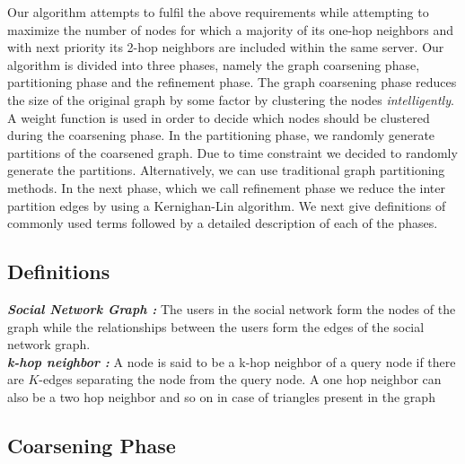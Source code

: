 \documentclass[letterpaper]{article}
\begin{document}
 Our algorithm attempts to fulfil the above requirements
while attempting to maximize the number of nodes for which a majority of its
one-hop neighbors and with next priority its 2-hop neighbors are included
within the same server.  Our algorithm is divided into three
phases, namely the graph coarsening phase, partitioning phase and the
refinement phase. The graph coarsening phase reduces the size of the original
graph by some factor by clustering the nodes \emph{intelligently}.  A weight
function is used in order to decide which nodes should be clustered  during the
coarsening phase. In the partitioning phase, we randomly generate partitions of
the coarsened graph. Due to time constraint we decided to randomly generate the
partitions. Alternatively, we can use traditional graph partitioning methods.
In the next phase, which we call refinement phase we reduce the inter partition
edges by using a Kernighan-Lin algorithm. We next give definitions of commonly
used terms followed by a detailed description of each of the phases.

\subsection{Definitions}
\textbf {\it{Social Network Graph :} }The users in the social network form the
nodes of the graph while the relationships between the users form the edges of
the social network graph.\\ \textbf{\it{k-hop neighbor :}} A node is said to be
a k-hop neighbor of a query node if there are  $K$-edges separating the node
from the query node. A one hop neighbor can also be a two hop neighbor and so
on in case of triangles present in the graph

\subsection{Coarsening Phase}
\end{document}
